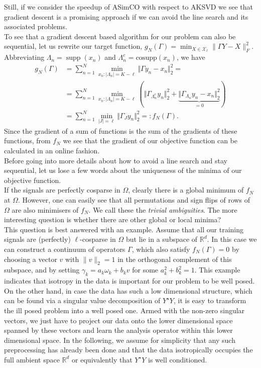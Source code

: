 \documentclass[11pt, onecolumn, journal,compsoc]{IEEEtran}
\newcommand{\cosupp}{\mathrm{cosupp}}
\newcommand{\R}{{\mathbb{R}}}
\newcommand{\supp}{\operatorname{supp}}
\newcommand{\Xcal}{\mathcal{X}}
\theoremstyle{plain}
\theoremstyle{remark}
\begin{document}
Still, if we consider the speedup of ASimCO with respect to AKSVD we see that gradient descent is a promising approach if we can avoid the line search and its associated problems. \\
To see that a gradient descent based algorithm for our problem can also be sequential, let us rewrite our target function, $g_N(\Gamma) = \min_{X\in \Xcal_\ell} \| \Gamma Y - X\|_F^2$.
Abbreviating $\Lambda_n=\supp(x_n)$ and $\Lambda^c_n=\cosupp(x_n)$, we have
\begin{align*}
g_N (\Gamma) &=\sum_{n=1}^N \min_{x_n:|\Lambda_n|=K-\ell}\Vert \Gamma y_n - x_n\Vert_2^2 =\\
& =  \sum_{n=1}^N \min_{x_n: |\Lambda_n|=K-\ell}(\Vert \Gamma_{\Lambda^c_n} y_n\Vert_2^2 + \underbrace{\Vert\Gamma_{\Lambda_n} y_n- x_n\Vert_2^2}_{=0})\\
&=\sum_{n=1}^N \min_{|J| = \ell} \Vert \Gamma_J y_n\Vert_2^2=: f_N(\Gamma).
\end{align*}
Since the gradient of a sum of functions is the sum of the gradients of these functions, from $f_N$ we see that the gradient of our objective function can be calculated in an online fashion.\\ 
Before going into more details about how to avoid a line search and stay sequential, let us lose a few words about the uniqueness of the minima of our objective function.\\
%
If the signals are perfectly cosparse in $\Omega$, clearly there is a global minimum of $f_N$ at $\Omega$. However, one can easily see that all permutations and sign flips of rows of $\Omega$ are also minimisers of $f_N$. We call these the \emph{trivial ambiguities}. The more interesting question is whether there are other global or local minima? \\
This question is best answered with an example. Assume that all our training signals are (perfectly) $\ell$-cosparse in $\Omega$ but lie in a subspace of $\R^d$. In this case we can construct a continuum of operators $\Gamma$, which also satisfy $f_N(\Gamma)=0$ by choosing a vector $v$ with $\|v\|_2=1$ in the orthogonal complement of this subspace, and by setting $\gamma_k = a_k \omega_k + b_k v$ for some $a^2_k + b^2_k=1$. 
%
This example indicates that isotropy in the data is important for our problem to be well posed. On the other hand, in case the data has such a low dimensional structure, which can be found via a singular value decomposition of $Y^\star Y$, it is easy to transform the ill posed problem into a well posed one. Armed with the non-zero singular vectors, we just have to project our data onto the lower dimensional space spanned by these vectors and learn the analysis operator within this lower dimensional space. In the following, we assume for simplicity that any such preprocessing has already been done and that the data isotropically occupies the full ambient space $\R^d$ or equivalently that $Y^\star Y$ is well conditioned.
\end{document}
